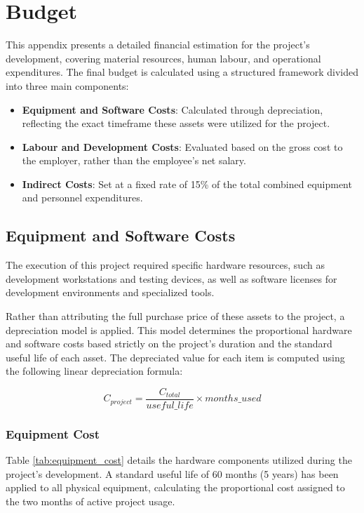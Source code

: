\chapter{Budget}\label{ap:budget}

This appendix presents a detailed financial estimation for the project's development, covering material resources, human labour, and operational expenditures. The final budget is calculated using a structured framework divided into three main components:

\begin{itemize}
    \item \textbf{Equipment and Software Costs}: Calculated through depreciation, reflecting the exact timeframe these assets were utilized for the project.
    \item \textbf{Labour and Development Costs}: Evaluated based on the gross cost to the employer, rather than the employee's net salary.
    \item \textbf{Indirect Costs}: Set at a fixed rate of 15\% of the total combined equipment and personnel expenditures.
\end{itemize}

\section{Equipment and Software Costs} \label{subsec:budget:equipment}
The execution of this project required specific hardware resources, such as development workstations and testing devices, as well as software licenses for development environments and specialized tools. 

Rather than attributing the full purchase price of these assets to the project, a depreciation model is applied. This model determines the proportional hardware and software costs based strictly on the project's duration and the standard useful life of each asset. The depreciated value for each item is computed using the following linear depreciation formula:

\begin{equation}
    C_{project} = \frac{C_{total}}{useful\_life} \times months\_used
\end{equation}

\subsection{Equipment Cost}
Table \ref{tab:equipment_cost} details the hardware components utilized during the project's development. A standard useful life of 60 months (5 years) has been applied to all physical equipment, calculating the proportional cost assigned to the two months of active project usage.

